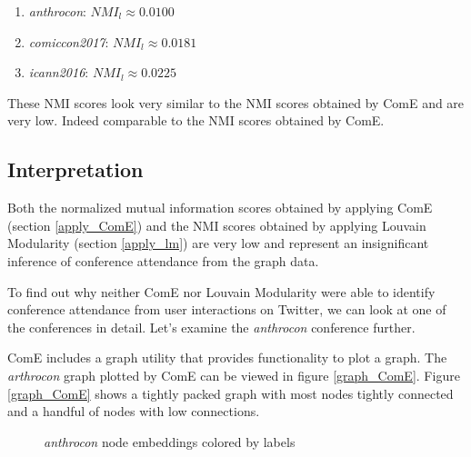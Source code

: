 \documentclass[sigconf]{acmart}
\begin{document}
\begin{enumerate}
	\item \textit{anthrocon}: $NMI_l \approx 0.0100$
	\item \textit{comiccon2017}: $NMI_l \approx 0.0181$
	\item \textit{icann2016}: $NMI_l \approx 0.0225$
\end{enumerate}

These NMI scores look very similar to the NMI scores obtained by ComE and are very low. Indeed comparable to the NMI scores obtained by ComE.

\subsection{Interpretation}

Both the normalized mutual information scores obtained by applying ComE (section \ref{apply_ComE}) and the NMI scores obtained by applying Louvain Modularity (section \ref{apply_lm}) are very low and represent an insignificant inference of conference attendance from the graph data.

To find out why neither ComE nor Louvain Modularity were able to identify conference attendance from user interactions on Twitter, we can look at one of the conferences in detail. Let's examine the \textit{anthrocon} conference further.

ComE includes a graph utility that provides functionality to plot a graph. The \textit{arthrocon} graph plotted by ComE can be viewed in figure \ref{graph_ComE}. Figure \ref{graph_ComE} shows a tightly packed graph with most nodes tightly connected and a handful of nodes with low connections.

\begin{figure}[H]
    \caption{\textit{anthrocon} node embeddings colored by labels}
    \label{node_embeddings}
\end{figure}
\end{document}
